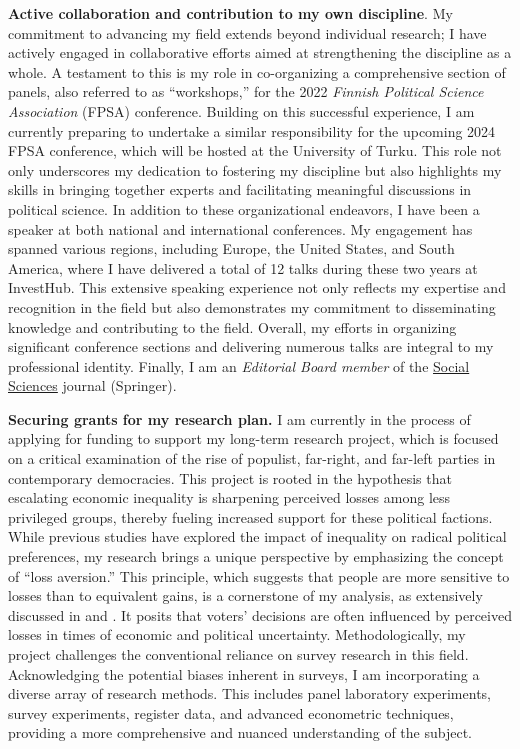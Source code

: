 \documentclass[10pt,stdletter,dateno,sigleft]{newlfm} %
\begin{document}
\begin{newlfm}
{\bf Active collaboration and contribution to my own discipline}. My commitment to advancing my field extends beyond individual research; I have actively engaged in collaborative efforts aimed at strengthening the discipline as a whole. A testament to this is my role in co-organizing a comprehensive section of panels, also referred to as ``workshops,'' for the 2022 \emph{Finnish Political Science Association} (FPSA) conference. Building on this successful experience, I am currently preparing to undertake a similar responsibility for the upcoming 2024 FPSA conference, which will be hosted at the University of Turku. This role not only underscores my dedication to fostering my discipline but also highlights my skills in bringing together experts and facilitating meaningful discussions in political science. In addition to these organizational endeavors, I have been a speaker at both national and international conferences. My engagement has spanned various regions, including Europe, the United States, and South America, where I have delivered a total of 12 talks during these two years at InvestHub. This extensive speaking experience not only reflects my expertise and recognition in the field but also demonstrates my commitment to disseminating knowledge and contributing to the field. Overall, my efforts in organizing significant conference sections and delivering numerous talks are integral to my professional identity. Finally, I am an \emph{Editorial Board member} of the \href{https://www.springer.com/journal/43545}{Social Sciences} journal (Springer).

{\bf Securing grants for my research plan.} I am currently in the process of applying for funding to support my long-term research project, which is focused on a critical examination of the rise of populist, far-right, and far-left parties in contemporary democracies. This project is rooted in the hypothesis that escalating economic inequality is sharpening perceived losses among less privileged groups, thereby fueling increased support for these political factions. While previous studies have explored the impact of inequality on radical political preferences, my research brings a unique perspective by emphasizing the concept of ``loss aversion.'' This principle, which suggests that people are more sensitive to losses than to equivalent gains, is a cornerstone of my analysis, as extensively discussed in \textcite{Bahamonde2022b} and \textcite{Bahamonde2023}. It posits that voters' decisions are often influenced by perceived losses in times of economic and political uncertainty. Methodologically, my project challenges the conventional reliance on survey research in this field. Acknowledging the potential biases inherent in surveys, I am incorporating a diverse array of research methods. This includes panel laboratory experiments, survey experiments, register data, and advanced econometric techniques, providing a more comprehensive and nuanced understanding of the subject.


\end{newlfm}
\end{document}
